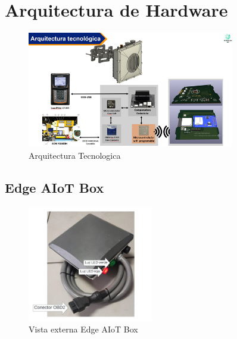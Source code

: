 \renewcommand{\sectionTitle}{Arquitectura de Hardware}


\section{\sectionTitle}
\label{sec:section4}

\begin{figure}[H]
    \centering
    \includegraphics[height=2in]{images/general_arquitectura.png}
    \captionsetup{font=footnotesize}
    \caption{Arquitectura Tecnologica}
    \label{fig:img5_1}
\end{figure}


\subsection{Edge AIoT Box}
\label{subsection:subsec5_1}

\begin{figure}[H]
    \centering
    \includegraphics[height=2in]{images/edge_isometrico.png}
    \captionsetup{font=footnotesize}
    \caption{Vista externa Edge AIoT Box}
    \label{fig:img5_2}
\end{figure}

